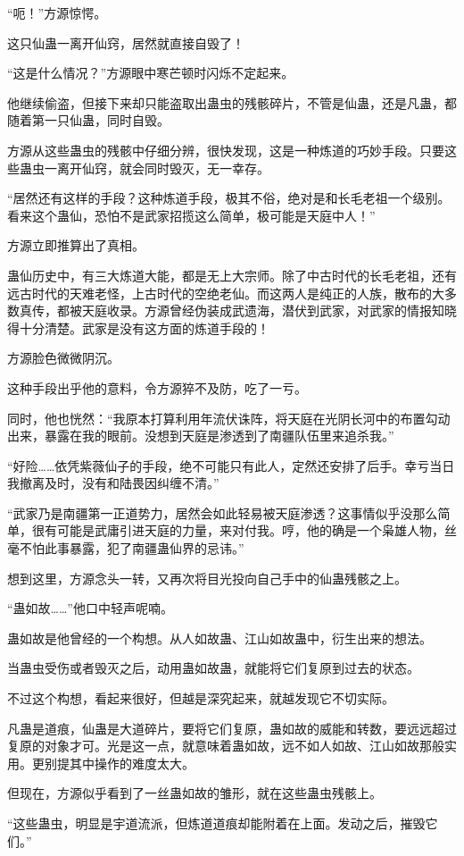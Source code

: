 \begin{this_body}
“呃！”方源惊愕。

这只仙蛊一离开仙窍，居然就直接自毁了！

“这是什么情况？”方源眼中寒芒顿时闪烁不定起来。

他继续偷盗，但接下来却只能盗取出蛊虫的残骸碎片，不管是仙蛊，还是凡蛊，都随着第一只仙蛊，同时自毁。

方源从这些蛊虫的残骸中仔细分辨，很快发现，这是一种炼道的巧妙手段。只要这些蛊虫一离开仙窍，就会同时毁灭，无一幸存。

“居然还有这样的手段？这种炼道手段，极其不俗，绝对是和长毛老祖一个级别。看来这个蛊仙，恐怕不是武家招揽这么简单，极可能是天庭中人！”

方源立即推算出了真相。

蛊仙历史中，有三大炼道大能，都是无上大宗师。除了中古时代的长毛老祖，还有远古时代的天难老怪，上古时代的空绝老仙。而这两人是纯正的人族，散布的大多数真传，都被天庭收录。方源曾经伪装成武遗海，潜伏到武家，对武家的情报知晓得十分清楚。武家是没有这方面的炼道手段的！

方源脸色微微阴沉。

这种手段出乎他的意料，令方源猝不及防，吃了一亏。

同时，他也恍然：“我原本打算利用年流伏诛阵，将天庭在光阴长河中的布置勾动出来，暴露在我的眼前。没想到天庭是渗透到了南疆队伍里来追杀我。”

“好险……依凭紫薇仙子的手段，绝不可能只有此人，定然还安排了后手。幸亏当日我撤离及时，没有和陆畏因纠缠不清。”

“武家乃是南疆第一正道势力，居然会如此轻易被天庭渗透？这事情似乎没那么简单，很有可能是武庸引进天庭的力量，来对付我。哼，他的确是一个枭雄人物，丝毫不怕此事暴露，犯了南疆蛊仙界的忌讳。”

想到这里，方源念头一转，又再次将目光投向自己手中的仙蛊残骸之上。

“蛊如故……”他口中轻声呢喃。

蛊如故是他曾经的一个构想。从人如故蛊、江山如故蛊中，衍生出来的想法。

当蛊虫受伤或者毁灭之后，动用蛊如故蛊，就能将它们复原到过去的状态。

不过这个构想，看起来很好，但越是深究起来，就越发现它不切实际。

凡蛊是道痕，仙蛊是大道碎片，要将它们复原，蛊如故的威能和转数，要远远超过复原的对象才可。光是这一点，就意味着蛊如故，远不如人如故、江山如故那般实用。更别提其中操作的难度太大。

但现在，方源似乎看到了一丝蛊如故的雏形，就在这些蛊虫残骸上。

“这些蛊虫，明显是宇道流派，但炼道道痕却能附着在上面。发动之后，摧毁它们。”


\end{this_body}
